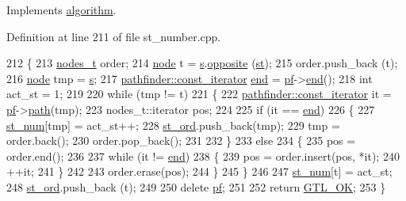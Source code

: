 Implements \mbox{\hyperlink{classalgorithm_a734b189509a8d6b56b65f8ff772d43ca}{algorithm}}.



Definition at line 211 of file st\+\_\+number.\+cpp.


\begin{DoxyCode}
212 \{
213     \mbox{\hyperlink{edge_8h_a22ac17689106ba21a84e7bc54d1199d6}{nodes\_t}} order;
214     \mbox{\hyperlink{classnode}{node}} t = \mbox{\hyperlink{classst__number_a1ada73c04f88b70b2392aa9ab0d1a6b0}{s}}.\mbox{\hyperlink{classnode_a13dbd1809a33a5efede64a359e53a363}{opposite}} (\mbox{\hyperlink{classst__number_a58fe3a128f0d06ce17742b62d8eff1a8}{st}});
215     order.push\_back (t);
216     \mbox{\hyperlink{classnode}{node}} tmp = \mbox{\hyperlink{classst__number_a1ada73c04f88b70b2392aa9ab0d1a6b0}{s}};
217     \mbox{\hyperlink{classpathfinder_1_1const__iterator}{pathfinder::const\_iterator}} \mbox{\hyperlink{classst__number_a3912b83a8cbddcb1fc804d20be528d52}{end}} = \mbox{\hyperlink{classst__number_a2aa9c83b684379d86c4e620f0a3e5703}{pf}}->\mbox{\hyperlink{classpathfinder_a2421f20a6252a46fbc1955322b0f9c55}{end}}();
218     \textcolor{keywordtype}{int} act\_st = 1;
219     
220     \textcolor{keywordflow}{while} (tmp != t)
221     \{
222         \mbox{\hyperlink{classpathfinder_1_1const__iterator}{pathfinder::const\_iterator}} it = \mbox{\hyperlink{classst__number_a2aa9c83b684379d86c4e620f0a3e5703}{pf}}->\mbox{\hyperlink{classpathfinder_ab4fffc6da33fb6b1e6badf3a4b3cfed4}{path}}(tmp);
223         nodes\_t::iterator pos;
224 
225         \textcolor{keywordflow}{if} (it == \mbox{\hyperlink{classst__number_a3912b83a8cbddcb1fc804d20be528d52}{end}})
226         \{
227             \mbox{\hyperlink{classst__number_ac3443aa6c9d11b990357d8ac1342cabc}{st\_num}}[tmp] = act\_st++;
228             \mbox{\hyperlink{classst__number_af2160b5e111fe3730b4f9f3f3d09f98f}{st\_ord}}.push\_back(tmp);
229             tmp = order.back();
230             order.pop\_back();
231 
232         \}
233         \textcolor{keywordflow}{else}
234         \{
235             pos = order.end();
236 
237             \textcolor{keywordflow}{while} (it != \mbox{\hyperlink{classst__number_a3912b83a8cbddcb1fc804d20be528d52}{end}})
238             \{
239                 pos = order.insert(pos, *it);
240                 ++it;
241             \}
242 
243             order.erase(pos);
244         \}
245     \}
246     
247     \mbox{\hyperlink{classst__number_ac3443aa6c9d11b990357d8ac1342cabc}{st\_num}}[t] = act\_st;
248     \mbox{\hyperlink{classst__number_af2160b5e111fe3730b4f9f3f3d09f98f}{st\_ord}}.push\_back (t);
249     
250     \textcolor{keyword}{delete} \mbox{\hyperlink{classst__number_a2aa9c83b684379d86c4e620f0a3e5703}{pf}};
251     
252     \textcolor{keywordflow}{return} \mbox{\hyperlink{classalgorithm_af1a0078e153aa99c24f9bdf0d97f6710a5114c20e4a96a76b5de9f28bf15e282b}{GTL\_OK}};
253 \}
\end{DoxyCode}
